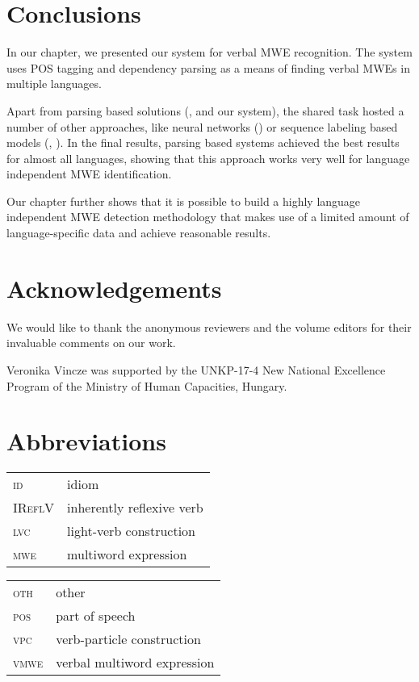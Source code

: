 \documentclass[output=paper,
modfonts,
]{langscibook}
\begin{document}
\section{Conclusions}

In our chapter, we presented our system for verbal MWE recognition. The system uses POS tagging and dependency parsing as a means of finding verbal MWEs in multiple languages.

Apart from parsing based solutions (\cite{W17-1717}, \cite{W17-1706} and our system), the shared task hosted a number of other approaches, like neural networks (\cite{W17-1707}) or sequence labeling based models (\cite{borocs2017}, \cite{maldonado2017}). In the final results, parsing based systems achieved the best results for almost all languages, showing that this approach works very well for language independent MWE identification.

Our chapter further shows that it is possible to build a highly language independent MWE detection methodology that makes use of a limited amount of language-specific data and achieve reasonable results. 

\section*{Acknowledgements}

We would like to thank the anonymous reviewers and the volume editors for their invaluable comments on our work.

Veronika Vincze was supported by the UNKP-17-4 New National Excellence Program of the Ministry of Human Capacities, Hungary.

\section*{Abbreviations}
\begin{tabularx}{.48\textwidth}{ll}
\textsc{id} & idiom\\
\textsc{IReflV} & inherently reflexive verb \\
\textsc{lvc} & light-verb construction \\
\textsc{mwe} & multiword expression \\
\end{tabularx}
\begin{tabularx}{.48\textwidth}{ll}
\textsc{oth} & other  \\
\textsc{pos} & part of speech  \\
\textsc{vpc} & verb-particle construction \\
\textsc{vmwe} & verbal multiword expression \\
\end{tabularx}



{\sloppy
\printbibliography[heading=subbibliography,notkeyword=this]
}
\end{document}

